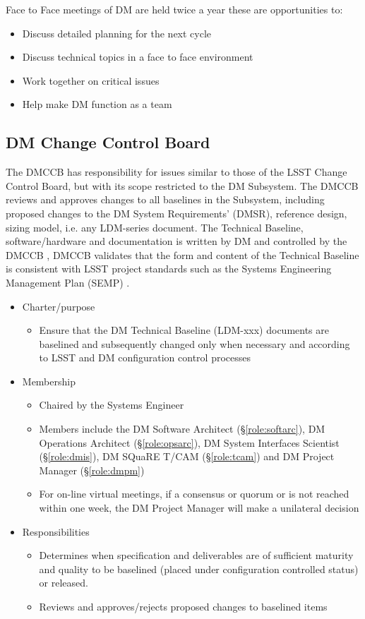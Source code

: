 Face to Face meetings of DM are held twice a year these are opportunities to:

\begin{itemize}
\item Discuss detailed planning for the next cycle
\item Discuss technical topics in a face to face environment
\item Work together on critical issues
\item Help make DM function as a team
\end{itemize}

\subsection{DM Change Control Board \label{sect:dmccb}}

The DMCCB has responsibility for issues similar to those of the LSST Change Control Board, but with its scope restricted to the DM Subsystem.
The DMCCB reviews and approves changes to all baselines in the Subsystem, including proposed changes to the DM System Requirements' (DMSR), reference design, sizing model, i.e. any LDM-series document.
The Technical Baseline, software/hardware and documentation is written by DM and controlled by the DMCCB
, DMCCB validates that the form and content of the Technical Baseline is consistent with LSST project standards such as the Systems Engineering Management Plan (SEMP) .

\begin{itemize}
\item Charter/purpose
	\begin{itemize}
	\item Ensure that the DM Technical Baseline (LDM-xxx) documents are baselined and subsequently changed only when necessary and according to LSST and DM configuration control processes
	\end{itemize}
\item Membership
	\begin{itemize}
	\item Chaired by the Systems Engineer
	\item Members include the DM Software Architect (\S\ref{role:softarc}), DM Operations Architect (\S\ref{role:opsarc}), DM System Interfaces Scientist (\S\ref{role:dmis}), DM SQuaRE T/CAM (\S\ref{role:tcam}) and DM Project Manager (\S\ref{role:dmpm})
	\item For on-line virtual meetings, if a consensus or quorum or is not reached within one week, the DM Project Manager will make a unilateral decision
	\end{itemize}
\item Responsibilities
	\begin{itemize}
	\item Determines when specification and deliverables are of sufficient maturity and quality to be baselined (placed under configuration controlled status) or released.
	\item Reviews and approves/rejects proposed changes to baselined items
	\end{itemize}
\end{itemize}

